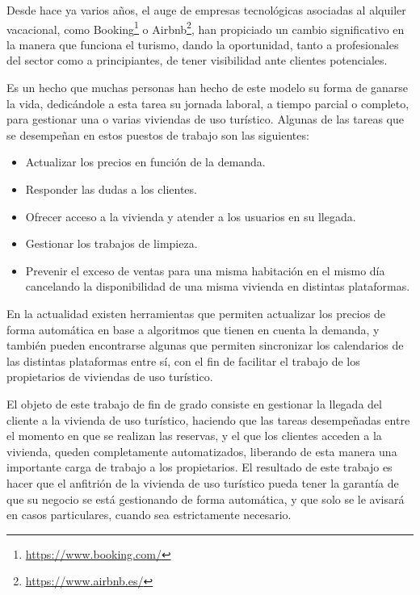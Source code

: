 \begin{resumen}

\noindent Desde hace ya varios años, el auge de empresas tecnológicas asociadas al alquiler vacacional, como Booking\footnote{\url{https://www.booking.com/}} o Airbnb\footnote{\url{https://www.airbnb.es/}}, han propiciado un cambio significativo en la manera que funciona el turismo, dando la oportunidad, tanto a profesionales del sector como a principiantes, de tener visibilidad ante clientes potenciales.

Es un hecho que muchas personas han hecho de este modelo su forma de ganarse la vida, dedicándole a esta tarea su jornada laboral, a tiempo parcial o completo, para gestionar una o varias viviendas de uso turístico. Algunas de las tareas que se desempeñan en estos puestos de trabajo son las siguientes:
\begin{itemize}
\item Actualizar los precios en función de la demanda.
\item Responder las dudas a los clientes.
\item Ofrecer acceso a la vivienda y atender a los usuarios en su llegada.
\item Gestionar los trabajos de limpieza.
\item Prevenir el exceso de ventas para una misma habitación en el mismo día cancelando la disponibilidad de una misma vivienda en distintas plataformas.
\end{itemize}

\noindent En la actualidad existen herramientas que permiten actualizar los precios de forma automática en base a algoritmos que tienen en cuenta la demanda, y también pueden encontrarse algunas que permiten sincronizar los calendarios de las distintas plataformas entre sí, con el fin de facilitar el trabajo de los propietarios de viviendas de uso turístico.

El objeto de este trabajo de fin de grado consiste en gestionar la llegada del cliente a la vivienda de uso turístico, haciendo que las tareas desempeñadas entre el momento en que se realizan las reservas, y el que los clientes acceden a la vivienda, queden completamente automatizados, liberando de esta manera una importante carga de trabajo a los propietarios. El resultado de este trabajo es hacer que el anfitrión de la vivienda de uso turístico pueda tener la garantía de que su negocio se está gestionando de forma automática, y que solo se le avisará en casos particulares, cuando sea estrictamente necesario.


\end{resumen}

